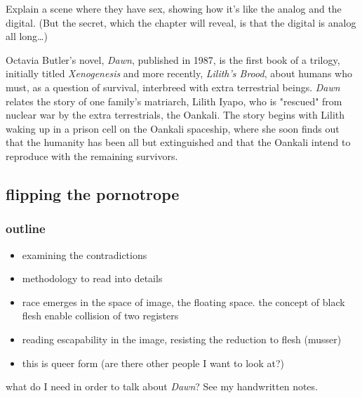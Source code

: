 \documentclass[11pt]{article}
\begin{document}
Explain a scene where they have sex, showing how it's like the analog
and the digital. (But the secret, which the chapter will reveal, is
that the digital is analog all long\ldots{})

Octavia Butler's novel, \emph{Dawn}, published in 1987, is the first book
of a trilogy, initially titled \emph{Xenogenesis} and more recently,
\emph{Lilith's Brood}, about humans who must, as a question of survival,
interbreed with extra terrestrial beings. \emph{Dawn} relates the story of
one family's matriarch, Lilith Iyapo, who is "rescued" from nuclear
war by the extra terrestrials, the Oankali. The story begins with
Lilith waking up in a prison cell on the Oankali spaceship, where she
soon finds out that the humanity has been all but extinguished and
that the Oankali intend to reproduce with the remaining survivors.

\subsection{flipping the pornotrope}
\label{sec:org3d7ae9e}
\subsubsection{outline}
\label{sec:orgae694a6}
\begin{itemize}
\item examining the contradictions
\item methodology to read into details
\item race emerges in the space of image, the floating space. the concept
of black flesh enable collision of two registers
\item reading escapability in the image, resisting the reduction to flesh (musser)
\item this is queer form (are there other people I want to look at?)
\end{itemize}


what do I need in order to talk about \emph{Dawn}? See my handwritten
notes.
\end{document}
